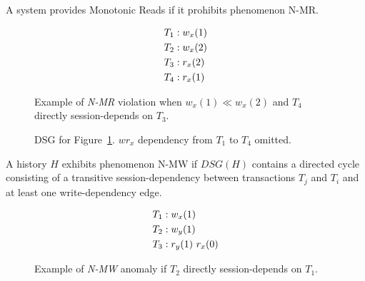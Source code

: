 \begin{definition}
A system provides Monotonic Reads if it prohibits phenomenon N-MR.
\end{definition}


\begin{figure}[H]
\begin{align*}
\small
T_1 &: w_x(1)\\
T_2 &: w_x(2)\\
T_3 &: r_x(2)\\
T_4 &: r_x(1)
\end{align*}
\caption{Example of \textit{N-MR} violation when $w_x(1) \ll w_x(2)$ and $T_4$ directly session-depends on $T_3$.}
\label{fig:nmr-history}
\end{figure}

\begin{figure}[H]
\centering
{}
\caption{DSG for Figure~\ref{fig:nmr-history}. $wr_x$ dependency from $T_1$ to $T_4$ omitted.} 
\label{fig:nmr-dsg}
\end{figure}

\begin{definition}
A history $H$ exhibits phenomenon N-MW if $DSG(H)$ contains a directed cycle
consisting of a transitive session-dependency between transactions
$T_j$ and $T_i$ and at least one write-dependency edge.
\end{definition}


\begin{figure}[H]
\begin{align*}
\small
T_1 &: w_x(1)\\
T_2 &: w_y(1)\\
T_3 &: r_y(1)~r_x(0)
\end{align*}
\caption{Example of \textit{N-MW} anomaly if $T_2$ directly session-depends on $T_1$.}
\label{fig:nmw-history}
\end{figure}

